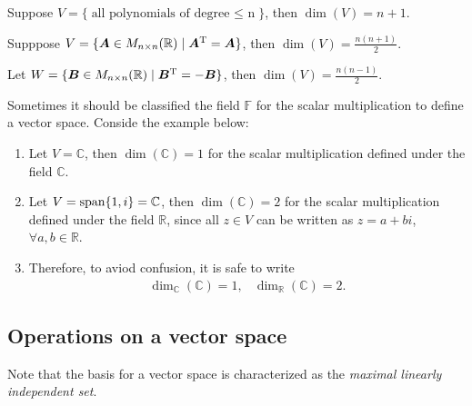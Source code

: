 \begin{example}
Suppose $V=\{\text{all polynomials of degree $\le$ n}\}$, then $\dim(V)=n+1$.
\end{example}

\begin{example}
Supppose $V=\{\bm A\in M_{n\times n}(\mathbb{R})\mid\bm A^{\mathrm T}=\bm A\}$, then 
$\dim(V)=\frac{n(n+1)}{2}$.
\end{example}

\begin{example}
Let $W=\{\bm B\in M_{n\times n}(\mathbb{R})\mid \bm B^{\mathrm T}=-\bm B\}$, then 
$\dim(V)=\frac{n(n-1)}{2}$.
\end{example}


\begin{remark}
Sometimes it should be classified the field $\mathbb{F}$ for the scalar multiplication to define a vector space. Conside the example below:
\begin{enumerate}
\item
Let $V=\mathbb{C}$, then $\dim(\mathbb{C})=1$ for the scalar multiplication defined under the field $\mathbb{C}$.
\item
Let $V=\operatorname{span}\{1,i\}=\mathbb{C}$, then $\dim(\mathbb{C})=2$ for the scalar multiplication defined under the field $\mathbb{R}$, since all $z\in V$ can be written as $z=a+bi$, $\forall a,b\in\mathbb{R}$.
\item
Therefore, to aviod confusion, it is safe to write
\[
\begin{array}{ll}
\dim_{\mathbb{C}}(\mathbb{C})=1,
&
\dim_{\mathbb{R}}(\mathbb{C})=2.
\end{array}
\]
\end{enumerate}
\end{remark}

\subsection{Operations on a vector space}
Note that the basis for a vector space is characterized as the \emph{maximal linearly independent set}.

